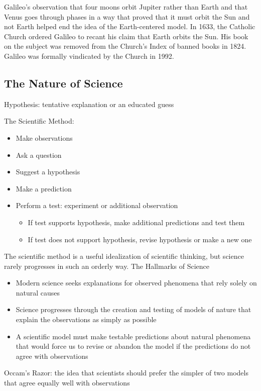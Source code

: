 \documentclass[12pt]{article}
\begin{document}
Galileo's observation that four moons orbit Jupiter rather than Earth and that Venus goes through phases in a way that proved that it must orbit the Sun and not Earth helped end the idea of the Earth-centered model. In 1633, the Catholic Church ordered Galileo to recant his claim that Earth orbits the Sun. His book on the subject was removed from the Church's Index of banned books in 1824. Galileo was formally vindicated by the Church in 1992. 

\subsection{The Nature of Science} 
\begin{definition} Hypothesis: tentative explanation or an educated guess \end{definition} 
The Scientific Method: \begin{itemize} 
\item Make observations
\item Ask a question
\item Suggest a hypothesis 
\item Make a prediction
\item Perform a test: experiment or additional observation \begin{itemize} 
\item If test supports hypothesis, make additional predictions and test them
\item If test does not support hypothesis, revise hypothesis or make a new one \end{itemize} \end{itemize} 
The scientific method is a useful idealization of scientific thinking, but science rarely progresses in such an orderly way. \newpage
The Hallmarks of Science \begin{itemize} 
\item Modern science seeks explanations for observed phenomena that rely solely on natural causes 
\item Science progresses through the creation and testing of models of nature that explain the observations as simply as possible
\item A scientific model must make testable predictions about natural phenomena that would force us to revise or abandon the model if the predictions do not agree with observations \end{itemize} 
\begin{definition} Occam's Razor: the idea that scientists should prefer the simpler of two models that agree equally well with observations \end{definition} 
\end{document}
